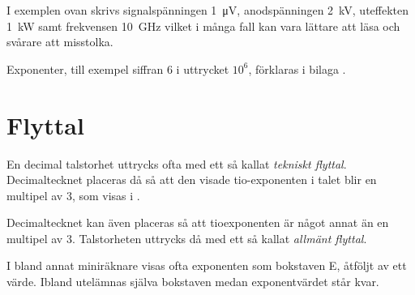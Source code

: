
I exemplen ovan skrivs signalspänningen \qty{1}{\micro\volt},
anodspänningen \qty{2}{\kilo\volt}, uteffekten \qty{1}{\kilo\watt} samt
frekvensen \qty{10}{\giga\hertz} vilket i många fall kan vara lättare
att läsa och svårare att misstolka.


Exponenter, till exempel siffran 6 i uttrycket \(10^6\), förklaras i
bilaga .


\section{Flyttal}

En decimal talstorhet uttrycks ofta med ett så kallat \emph{tekniskt
flyttal}.  Decimaltecknet placeras då så att den visade tio-exponenten
i talet blir en multipel av 3, som visas i .

Decimaltecknet kan även placeras så att tioexponenten är något annat
än en multipel av 3.  Talstorheten uttrycks då med ett så kallat
\emph{allmänt flyttal}.

I bland annat miniräknare visas ofta exponenten som bokstaven E,
åtföljt av ett värde.  Ibland utelämnas själva bokstaven medan
exponentvärdet står kvar.

\bigskip


